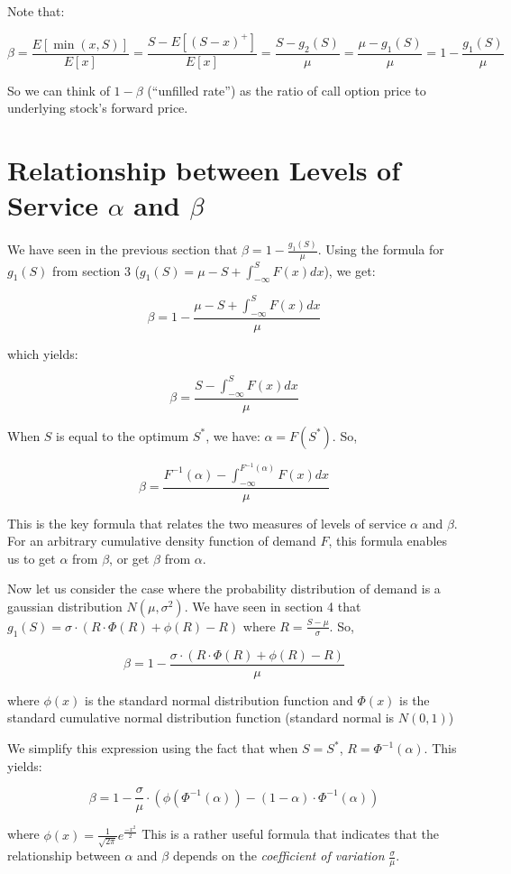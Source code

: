 \documentclass[11pt, oneside]{article}   	%
\begin{document}
Note that:

$$\beta = \frac {E[\min(x, S)]} {E[x]} = \frac {S - E[(S-x)^+]} {E[x]} =  \frac {S - g_2(S) } {\mu} = \frac {\mu - g_1(S)} {\mu} = 1 - \frac {g_1(S)} {\mu}$$

So we can think of $1-\beta$ (``unfilled rate'') as the ratio of call option price to underlying stock's forward price.

\section{Relationship between Levels of Service $\alpha$ and $\beta$}

We have seen in the previous section that $\beta = 1 - \frac {g_1(S)} {\mu}$. Using the formula for $g_1(S)$ from section 3 ($g_1(S) = \mu - S + \int_{-\infty}^S F(x) dx$), we get: 

$$\beta = 1 - \frac {\mu - S + \int_{-\infty}^S F(x) dx} {\mu}$$

which yields:

$$\beta = \frac {S - \int_{-\infty}^S F(x) dx} {\mu}$$

When $S$ is equal to the optimum $S^*$, we have: $\alpha = F(S^*)$. So,

$$\beta = \frac {F^{-1}(\alpha) - \int_{-\infty}^{F^{-1}(\alpha)} F(x) dx} {\mu}$$

This is the key formula that relates the two measures of levels of service $\alpha$ and $\beta$. For an arbitrary cumulative density function of demand $F$, this formula enables us to get $\alpha$ from $\beta$, or get $\beta$ from $\alpha$.

Now let us consider the case where the probability distribution of demand is a gaussian distribution $N(\mu, \sigma^2)$. We have seen in section 4 that $g_1(S) = \sigma \cdot (R \cdot \Phi(R) + \phi(R) - R)$ where $R = \frac {S - \mu} {\sigma}$. So,

$$\beta = 1 - \frac {\sigma \cdot (R \cdot \Phi(R) + \phi(R) - R)} {\mu}$$

where $\phi(x)$ is the standard normal distribution function and $\Phi(x)$ is the standard cumulative normal distribution function (standard normal is $N(0, 1)$)

We simplify this expression using the fact that when $S = S^*$, $R = \Phi^{-1}(\alpha)$. This yields:

$$\beta = 1 - \frac {\sigma} {\mu} \cdot (\phi(\Phi^{-1}(\alpha)) - (1 - \alpha) \cdot \Phi^{-1}(\alpha))$$

where $\phi(x) = \frac 1 {\sqrt{2 \pi}} e^{\frac {-x^2} 2}$
This is a rather useful formula that indicates that the relationship between $\alpha$ and $\beta$ depends on the {\em coefficient of variation} $\frac \sigma \mu$.
\end{document}
